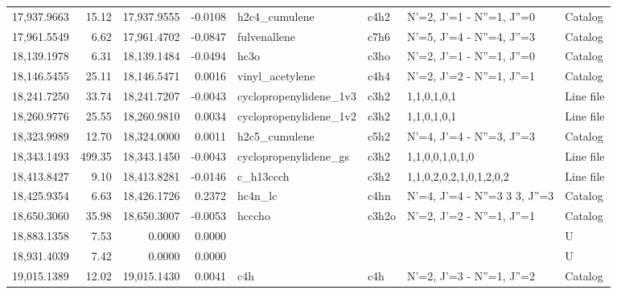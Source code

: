 \begin{longtable}{rrrrllll}
17,937.9663 &     15.12 &       17,937.9555 &   -0.0108 &               h2c4_cumulene &    c4h2 &            N'=2, J'=1 - N''=1, J''=0 &    Catalog \\
17,961.5549 &      6.62 &       17,961.4702 &   -0.0847 &                fulvenallene &    c7h6 &            N'=5, J'=4 - N''=4, J''=3 &    Catalog \\
18,139.1978 &      6.31 &       18,139.1484 &   -0.0494 &                        hc3o &    c3ho &            N'=2, J'=1 - N''=1, J''=0 &    Catalog \\
18,146.5455 &     25.11 &       18,146.5471 &    0.0016 &             vinyl_acetylene &    c4h4 &            N'=2, J'=2 - N''=1, J''=1 &    Catalog \\
18,241.7250 &     33.74 &       18,241.7207 &   -0.0043 &      cyclopropenylidene_1v3 &    c3h2 &                          1,1,0,1,0,1 &  Line file \\
18,260.9776 &     25.55 &       18,260.9810 &    0.0034 &      cyclopropenylidene_1v2 &    c3h2 &                          1,1,0,1,0,1 &  Line file \\
18,323.9989 &     12.70 &       18,324.0000 &    0.0011 &               h2c5_cumulene &    c5h2 &            N'=4, J'=4 - N''=3, J''=3 &    Catalog \\
18,343.1493 &    499.35 &       18,343.1450 &   -0.0043 &       cyclopropenylidene_gs &    c3h2 &                      1,1,0,0,1,0,1,0 &  Line file \\
18,413.8427 &      9.10 &       18,413.8281 &   -0.0146 &                   c_h13ccch &    c3h2 &              1,1,0,2,0,2,1,0,1,2,0,2 &  Line file \\
18,425.9354 &      6.63 &       18,426.1726 &    0.2372 &                     hc4n_lc &    c4hn &      N'=4, J'=4 - N''=3 3   3, J''=3 &    Catalog \\
18,650.3060 &     35.98 &       18,650.3007 &   -0.0053 &                      hcccho &   c3h2o &            N'=2, J'=2 - N''=1, J''=1 &    Catalog \\
18,883.1358 &      7.53 &            0.0000 &    0.0000 &                             &         &                                      &          U \\
18,931.4039 &      7.42 &            0.0000 &    0.0000 &                             &         &                                      &          U \\
19,015.1389 &     12.02 &       19,015.1430 &    0.0041 &                         c4h &     c4h &            N'=2, J'=3 - N''=1, J''=2 &    Catalog \\

\end{longtable}
